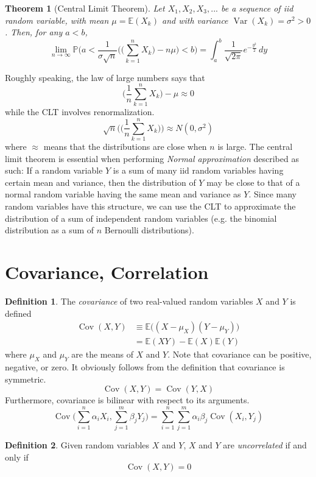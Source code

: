 \documentclass{article}
\DeclareMathOperator{\Cov}{Cov}
\DeclareMathOperator{\Var}{Var}
\newtheorem{theorem}{Theorem}[section]
\theoremstyle{remark}
\theoremstyle{definition}
\newtheorem{definition}{Definition}[section]
\begin{document}
\begin{theorem}[Central Limit Theorem]
Let $X_1, X_2, X_3, ...$ be a sequence of iid random variable, with mean $\mu = \mathbb{E}(X_k)$ and with variance $\Var(X_k) = \sigma^2 > 0$. Then, for any $a < b$, 
\[\lim_{n \rightarrow \infty} \mathbb{P} \bigg( a < \frac{1}{\sigma \sqrt{n}} \bigg( \Big( \sum_{k=1}^n X_k \Big) - n \mu \bigg) < b \bigg) = \int_a^b \frac{1}{\sqrt{2\pi}} e^{-\frac{y^2}{2}}\, dy\]
\end{theorem}
Roughly speaking, the law of large numbers says that 
\[\Big( \frac{1}{n} \sum_{k=1}^n X_k \Big) - \mu \approx 0\]
while the CLT involves renormalization. 
\[\sqrt{n} \bigg( \Big( \frac{1}{n} \sum_{k=1}^n X_k \Big) \bigg) \approx N(0, \sigma^2)\]
where $\approx$ means that the distributions are close when $n$ is large. The central limit theorem is essential when performing \textit{Normal approximation} described as such: If a random variable $Y$ is a sum of many iid random variables having certain mean and variance, then the distribution of $Y$ may be close to that of a normal random variable having the same mean and variance as $Y$. Since many random variables have this structure, we can use the CLT to approximate the distribution of a sum of independent random variables (e.g. the binomial distribution as a sum of $n$ Bernoulli distributions). 

\section{Covariance, Correlation}
\begin{definition}
The \textit{covariance} of two real-valued random variables $X$ and $Y$ is defined
\begin{align*}
    \Cov(X, Y) & \equiv \mathbb{E}\big( (X - \mu_X) (Y - \mu_Y)\big) \\
    & = \mathbb{E}(X Y) - \mathbb{E}(X) \mathbb{E}(Y) 
\end{align*}
where $\mu_X$ and $\mu_Y$ are the means of $X$ and $Y$. Note that covariance can be positive, negative, or zero. It obviously follows from the definition that covariance is symmetric. 
\[\Cov(X, Y) = \Cov(Y, X)\]
Furthermore, covariance is bilinear with respect to its arguments.
\[\Cov \bigg( \sum_{i=1}^n \alpha_i X_i , \sum_{j=1}^m \beta_j Y_j \bigg) = \sum_{i=1}^n \sum_{j=1}^m \alpha_i \beta_j \Cov(X_i, Y_j)\]
\end{definition}

\begin{definition}
Given random variables $X$ and $Y$, $X$ and $Y$ are \textit{uncorrelated} if and only if 
\[\Cov(X, Y) = 0\]
\end{definition}
\end{document}
